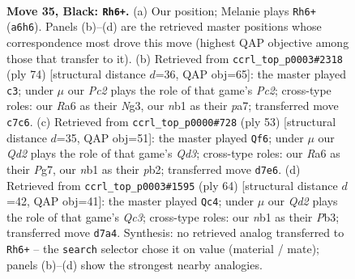 \documentclass[11pt]{article}
\begin{document}
\clearpage

\begin{figure}[p]\centering
\begin{subfigure}{0.46\textwidth}\centering
\resizebox{\linewidth}{!}{%
\newchessgame
\chessboard[
  setfen={1r4k1/2pq1p2/r7/2Q5/2P1P1P1/3P4/7K/1N3R2 b - - 0 35},
  showmover=false,
  pgfstyle=straightmove, color=movearrow, markmove={a6-h6}
]}
\caption{}
\end{subfigure}\hfill
\begin{subfigure}{0.46\textwidth}\centering
\resizebox{\linewidth}{!}{%
\newchessgame
\chessboard[
  setfen={r6k/p3R1p1/2p4p/8/2q5/6N1/P1PQ3P/6K1 w - - 2 38},
  showmover=false,
  pgfstyle=straightmove, color=movearrow, markmove={c2-c3}
]}
\caption{}
\end{subfigure}
\\[4pt]
\begin{subfigure}{0.46\textwidth}\centering
\resizebox{\linewidth}{!}{%
\newchessgame
\chessboard[
  setfen={1r5k/p5p1/3q3p/8/8/P3QP2/1P5P/K6R b - - 2 27},
  showmover=false,
  pgfstyle=straightmove, color=movearrow, markmove={d6-f6}
]}
\caption{}
\end{subfigure}\hfill
\begin{subfigure}{0.46\textwidth}\centering
\resizebox{\linewidth}{!}{%
\newchessgame
\chessboard[
  setfen={1r3k2/p3p2p/5p2/7q/8/KPQ2P2/2P5/6R1 w - - 0 33},
  showmover=false,
  pgfstyle=straightmove, color=movearrow, markmove={c3-c4}
]}
\caption{}
\end{subfigure}
\caption{\textbf{Move 35, Black: \texttt{Rh6+}.} (a) Our position; Melanie plays \texttt{Rh6+} (\texttt{a6h6}). Panels (b)--(d) are the retrieved master positions whose correspondence most drove this move (highest QAP objective among those that transfer to it). (b) Retrieved from \texttt{ccrl\_top\_p0003\#2318} (ply 74) [structural distance $d$=36, QAP obj=65]: the master played \texttt{c3}; under $\mu$ our \emph{Pc2} plays the role of that game's \emph{Pc2}; cross-type roles: our \emph{R}a6 as their \emph{N}g3, our \emph{n}b1 as their \emph{p}a7; transferred move \texttt{c7c6}. (c) Retrieved from \texttt{ccrl\_top\_p0000\#728} (ply 53) [structural distance $d$=35, QAP obj=51]: the master played \texttt{Qf6}; under $\mu$ our \emph{Qd2} plays the role of that game's \emph{Qd3}; cross-type roles: our \emph{R}a6 as their \emph{P}g7, our \emph{n}b1 as their \emph{p}b2; transferred move \texttt{d7e6}. (d) Retrieved from \texttt{ccrl\_top\_p0003\#1595} (ply 64) [structural distance $d$=42, QAP obj=41]: the master played \texttt{Qc4}; under $\mu$ our \emph{Qd2} plays the role of that game's \emph{Qc3}; cross-type roles: our \emph{n}b1 as their \emph{P}b3; transferred move \texttt{d7a4}. Synthesis: no retrieved analog transferred to \texttt{Rh6+} -- the \texttt{search} selector chose it on value (material / mate); panels (b)--(d) show the strongest nearby analogies.}
\label{fig:thought-m69}
\end{figure}
\end{document}
